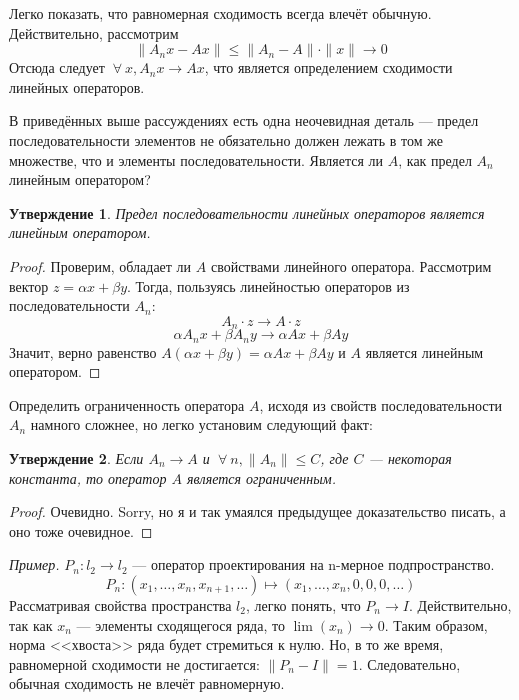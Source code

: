 \documentclass[12pt]{article}
\let\foralltemp\forall
\renewcommand{\forall}{\: \foralltemp \:}
\newcommand{\example}{{\itshape Пример. }}
\newcommand{\norm}[1]{\| #1 \|}
\renewcommand{\leq}{\leqslant}
\newtheorem{state}{Утверждение}[section] %
\begin{document}
	Легко показать, что равномерная сходимость всегда влечёт обычную. Действительно, рассмотрим
	$$\norm{A_n x - A x} \leq \norm{A_n - A} \cdot \norm{x} \rightarrow 0$$
	Отсюда следует $\forall x, A_n x \rightarrow A x$, что является определением сходимости линейных операторов.
	
	В приведённых выше рассуждениях есть одна неочевидная деталь --- предел последовательности элементов не обязательно должен лежать
	в том же множестве, что и элементы последовательности. Является ли $A$, как предел $A_n$ линейным оператором?
	
	\begin{state}
		Предел последовательности линейных операторов является линейным оператором.
	\end{state}
	\begin{proof}
		Проверим, обладает ли $A$ свойствами линейного оператора. Рассмотрим вектор $z = \alpha x + \beta y$. Тогда, пользуясь линейностью
		операторов из последовательности $A_n$:
		$$ A_n \cdot z \rightarrow A \cdot z $$
		$$ \alpha A_n x + \beta A_n y \rightarrow \alpha A x + \beta A y $$
		Значит, верно равенство $A(\alpha x + \beta y) = \alpha A x + \beta A y$ и $A$ является линейным оператором.
	\end{proof}
	
	Определить ограниченность оператора $A$, исходя из свойств последовательности $A_n$ намного сложнее, но легко установим следующий
	факт:
	\begin{state}
		Если $A_n \rightarrow A$ и $\forall n, \norm{A_n} \leq C$, где $C$ --- некоторая константа, то оператор $A$ является ограниченным.
	\end{state} 
	\begin{proof}
		Очевидно. {\color{gray}Sorry, но я и так умаялся предыдущее доказательство писать, а оно тоже очевидное.}
	\end{proof}

	\example $P_n : l_2 \rightarrow l_2$ --- оператор проектирования на n-мерное подпространство.
	$$P_n : (x_1, \dots , x_n, x_{n+1}, \dots) \longmapsto (x_1, \dots, x_n, 0, 0, 0, \dots)$$
	Рассматривая свойства пространства $l_2$, легко понять, что $P_n \rightarrow I$. Действительно, так как $x_n$ --- элементы 
	сходящегося ряда, то $\lim (x_n) \rightarrow 0$. Таким образом, норма <<хвоста>> ряда будет стремиться к нулю.
	Но, в то же время, равномерной сходимости не достигается: $\norm{P_n - I} = 1$. Следовательно, обычная сходимость не влечёт
	равномерную.
	
\end{document}

